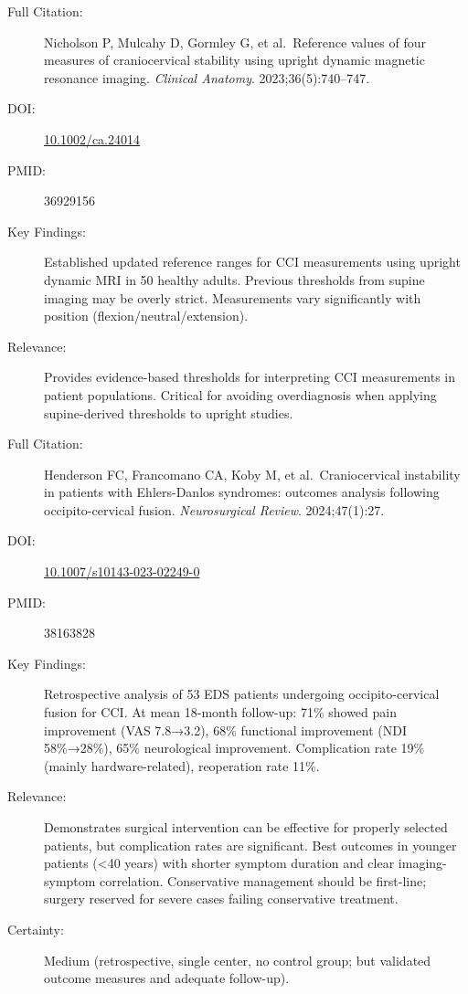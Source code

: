 \begin{description}
    \item[Full Citation:] Nicholson P, Mulcahy D, Gormley G, et al.\ Reference values of four measures of craniocervical stability using upright dynamic magnetic resonance imaging. \textit{Clinical Anatomy}. 2023;36(5):740--747.
    \item[DOI:] \href{https://doi.org/10.1002/ca.24014}{10.1002/ca.24014}
    \item[PMID:] 36929156
    \item[Key Findings:] Established updated reference ranges for CCI measurements using upright dynamic MRI in 50 healthy adults. Previous thresholds from supine imaging may be overly strict. Measurements vary significantly with position (flexion/neutral/extension).
    \item[Relevance:] Provides evidence-based thresholds for interpreting CCI measurements in patient populations. Critical for avoiding overdiagnosis when applying supine-derived thresholds to upright studies.
\end{description}

\begin{description}
    \item[Full Citation:] Henderson FC, Francomano CA, Koby M, et al.\ Craniocervical instability in patients with Ehlers-Danlos syndromes: outcomes analysis following occipito-cervical fusion. \textit{Neurosurgical Review}. 2024;47(1):27.
    \item[DOI:] \href{https://doi.org/10.1007/s10143-023-02249-0}{10.1007/s10143-023-02249-0}
    \item[PMID:] 38163828
    \item[Key Findings:] Retrospective analysis of 53 EDS patients undergoing occipito-cervical fusion for CCI. At mean 18-month follow-up: 71\% showed pain improvement (VAS 7.8→3.2), 68\% functional improvement (NDI 58\%→28\%), 65\% neurological improvement. Complication rate 19\% (mainly hardware-related), reoperation rate 11\%.
    \item[Relevance:] Demonstrates surgical intervention can be effective for properly selected patients, but complication rates are significant. Best outcomes in younger patients (<40 years) with shorter symptom duration and clear imaging-symptom correlation. Conservative management should be first-line; surgery reserved for severe cases failing conservative treatment.
    \item[Certainty:] Medium (retrospective, single center, no control group; but validated outcome measures and adequate follow-up).
\end{description}

